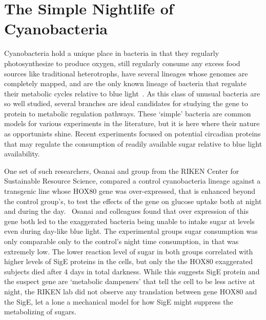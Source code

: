 \documentclass [12pt]{article}
\begin{document}
\section{The Simple Nightlife of Cyanobacteria}
	\indent Cyanobacteria hold a unique place in bacteria in that they regularly photosynthesize to produce oxygen, still regularly consume any excess food sources like traditional heterotrophs, have several lineages whose genomes are completely mapped, and are the only known lineage of bacteria that regulate their metabolic cycles relative to blue light~\autocite{Tseng2014}. As this class of unusual bacteria are so well studied, several branches are ideal candidates for studying the gene to protein to metabolic regulation pathways. These {`}simple' bacteria are common models for various experiments in the literature, but it is here where their nature as opportunists shine. Recent experiments focused on potential circadian proteins that may regulate the consumption of readily available sugar relative to blue light availability. \par
	\indent One set of such researchers, Osanai and group from the RIKEN Center for Sustainable Resource Science, compared a control cyanobacteria lineage against a transgenic line whose HOX80 gene was over-expressed, that is enhanced beyond the control group's, to test the effects of the gene on glucose uptake both at night and during the day.~\autocite{Osanai2014} Osanai and colleagues found that over expression of this gene both led to the exaggerated bacteria being unable to intake sugar at levels even during day-like blue light. The experimental groups sugar consumption was only comparable only to the control's night time consumption, in that was extremely low. The lower reaction level  of sugar in both groups correlated with higher levels of SigE proteins in the cells, but only the the HOX80 exaggerated subjects died after 4 days in total darkness. While this suggests SigE protein and the suspect gene are {`}metabolic dampeners' that tell the cell to be less active at night, the RIKEN lab did not observe any translation between gene HOX80 and the SigE, let a lone a mechanical model for how SigE might suppress the metabolizing of sugars.~\autocite{Osanai2014} \par
\end{document}
